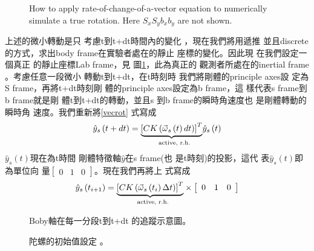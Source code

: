 \documentclass{article}
\begin{document}
\begin{figure}[th]
\caption{How to apply rate-of-change-of-a-vector equation to numerically
simulate a true rotation. Here $S_{x}S_{y}b_{x}b_{y}$ are not shown.}
\label{szsbtdtfig}
\begin{center}
\fbox{}
\end{center}
\end{figure}

上述的微小轉動是只%
考慮t到t+dt時間內的變化%
，現在我們將用遞推%
並且discrete的方式，求出body
frame在實驗者處在的靜止%
座標的變化。因此現%
在我們設定一個真正%
的靜止座標Lab frame\thinspace ，見%
圖\ref{szsbtdtfig}，此為真正的%
觀測者所處在的inertial frame%
。考慮任意一段微小%
轉動t到t+dt，在t時刻時%
我們將剛體的principle axes設%
定為S frame，再將t+dt時刻剛%
體的principle axes設定為b frame，這%
樣代表s frame到b frame就是剛%
體t到t+dt的轉動，並且s%
到b frame的瞬時角速度也%
是剛體轉動的瞬時角%
速度。我們重新將\ref{vecrot}%
式寫成%
\begin{equation}
\hat{y}_{s}\left( t+dt\right) =\underset{\text{active, r.h.}}{\underbrace{%
\left[ CK\left( \vec{\omega}_{s}\left( t\right) dt\right) \right] ^{T}}}\hat{%
y}_{s}\left( t\right)  \label{vecrot05}
\end{equation}%
$\hat{y}_{s}\left( t\right) $現在為t時間%
剛體特徵軸$\hat{y}$在s frame(也%
是t時刻)的投影，這代%
表$\hat{y}_{s}\left( t\right) $即為單位向%
量$\left[ 
\begin{array}{ccc}
0 & 1 & 0%
\end{array}%
\right] $。現在我們再將上%
式寫成%
\begin{equation}
\hat{y}_{s}\left( t_{i+1}\right) =\underset{\text{active, r.h.}}{\underbrace{%
\left[ CK\left( \vec{\omega}_{s}\left( t_{i}\right) \Delta t\right) \right]
^{T}}}\times \left[ 
\begin{array}{ccc}
0 & 1 & 0%
\end{array}%
\right]  \label{vecrot1}
\end{equation}

\begin{figure}[th]
\caption{Boby軸在每一分段t到t+dt%
的追蹤示意圖。}
\begin{center}
\fbox{}
\end{center}
\end{figure}

\begin{figure}[th]
\caption{陀螺的初始值設定%
。}
\begin{center}
\fbox{}
\end{center}
\end{figure}
\end{document}
